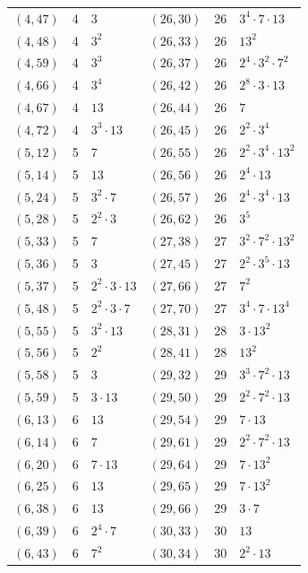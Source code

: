 \documentclass[11pt]{article}
\begin{document}
\begin{longtable}{@{}lrl@{\qquad}lrl@{}}
$(4,47)$ & 4 & $3$ & $(26,30)$ & 26 & $3^{4}\cdot 7\cdot 13$\\
$(4,48)$ & 4 & $3^{2}$ & $(26,33)$ & 26 & $13^{2}$\\
$(4,59)$ & 4 & $3^{3}$ & $(26,37)$ & 26 & $2^{4}\cdot 3^{2}\cdot 7^{2}$\\
$(4,66)$ & 4 & $3^{4}$ & $(26,42)$ & 26 & $2^{8}\cdot 3\cdot 13$\\
$(4,67)$ & 4 & $13$ & $(26,44)$ & 26 & $7$\\
$(4,72)$ & 4 & $3^{3}\cdot 13$ & $(26,45)$ & 26 & $2^{2}\cdot 3^{4}$\\
$(5,12)$ & 5 & $7$ & $(26,55)$ & 26 & $2^{2}\cdot 3^{4}\cdot 13^{2}$\\
$(5,14)$ & 5 & $13$ & $(26,56)$ & 26 & $2^{4}\cdot 13$\\
$(5,24)$ & 5 & $3^{2}\cdot 7$ & $(26,57)$ & 26 & $2^{4}\cdot 3^{4}\cdot 13$\\
$(5,28)$ & 5 & $2^{2}\cdot 3$ & $(26,62)$ & 26 & $3^{5}$\\
$(5,33)$ & 5 & $7$ & $(27,38)$ & 27 & $3^{2}\cdot 7^{2}\cdot 13^{2}$\\
$(5,36)$ & 5 & $3$ & $(27,45)$ & 27 & $2^{2}\cdot 3^{5}\cdot 13$\\
$(5,37)$ & 5 & $2^{2}\cdot 3\cdot 13$ & $(27,66)$ & 27 & $7^{2}$\\
$(5,48)$ & 5 & $2^{2}\cdot 3\cdot 7$ & $(27,70)$ & 27 & $3^{4}\cdot 7\cdot 13^{4}$\\
$(5,55)$ & 5 & $3^{2}\cdot 13$ & $(28,31)$ & 28 & $3\cdot 13^{2}$\\
$(5,56)$ & 5 & $2^{2}$ & $(28,41)$ & 28 & $13^{2}$\\
$(5,58)$ & 5 & $3$ & $(29,32)$ & 29 & $3^{3}\cdot 7^{2}\cdot 13$\\
$(5,59)$ & 5 & $3\cdot 13$ & $(29,50)$ & 29 & $2^{2}\cdot 7^{2}\cdot 13$\\
$(6,13)$ & 6 & $13$ & $(29,54)$ & 29 & $7\cdot 13$\\
$(6,14)$ & 6 & $7$ & $(29,61)$ & 29 & $2^{2}\cdot 7^{2}\cdot 13$\\
$(6,20)$ & 6 & $7\cdot 13$ & $(29,64)$ & 29 & $7\cdot 13^{2}$\\
$(6,25)$ & 6 & $13$ & $(29,65)$ & 29 & $7\cdot 13^{2}$\\
$(6,38)$ & 6 & $13$ & $(29,66)$ & 29 & $3\cdot 7$\\
$(6,39)$ & 6 & $2^{4}\cdot 7$ & $(30,33)$ & 30 & $13$\\
$(6,43)$ & 6 & $7^{2}$ & $(30,34)$ & 30 & $2^{2}\cdot 13$\\

\end{longtable}
\end{document}

